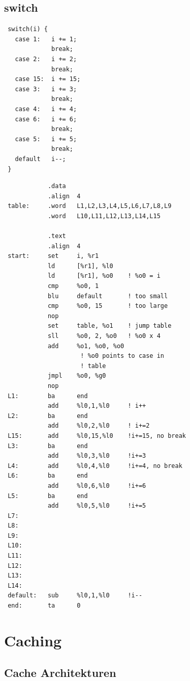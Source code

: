 \documentclass[german, 10pt, a4paper, twocolumn]{scrartcl}
\begin{document}
\subsection{switch}

\begin{verbatim}
 switch(i) {
   case 1:   i += 1;
             break;
   case 2:   i += 2;
             break;
   case 15:  i += 15;
   case 3:   i += 3;
             break;
   case 4:   i += 4;
   case 6:   i += 6;
             break;
   case 5:   i += 5;
             break;
   default   i--;
 }
\end{verbatim}


\small
\begin{verbatim}
            .data
            .align  4
 table:     .word   L1,L2,L3,L4,L5,L6,L7,L8,L9
            .word   L10,L11,L12,L13,L14,L15

            .text
            .align  4
 start:     set     i, %r1
            ld      [%r1], %l0
            ld      [%r1], %o0    ! %o0 = i
            cmp     %o0, 1
            blu     default       ! too small
            cmp     %o0, 15       ! too large
            nop
            set     table, %o1    ! jump table
            sll     %o0, 2, %o0   ! %o0 x 4
            add     %o1, %o0, %o0
                     ! %o0 points to case in
                     ! table
            jmpl    %o0, %g0
            nop
 L1:        ba      end
            add     %l0,1,%l0     ! i++
 L2:        ba      end
            add     %l0,2,%l0     ! i+=2
 L15:       add     %l0,15,%l0    !i+=15, no break
 L3:        ba      end
            add     %l0,3,%l0     !i+=3
 L4:        add     %l0,4,%l0     !i+=4, no break
 L6:        ba      end
            add     %l0,6,%l0     !i+=6
 L5:        ba      end
            add     %l0,5,%l0     !i+=5
 L7:
 L8:
 L9:
 L10:
 L11:
 L12:
 L13:
 L14:
 default:   sub     %l0,1,%l0     !i--
 end:       ta      0
\end{verbatim}
\normalsize

\section{Caching}

\subsection{Cache Architekturen}
\end{document}
